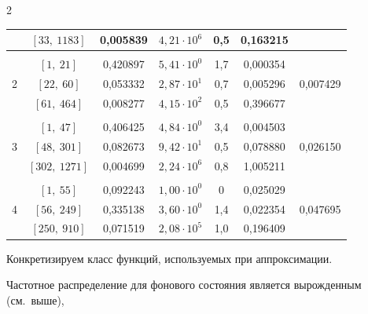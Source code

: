\begin{multicols}{2}
\begin{table}
\begin{center}
\begin{tabular}{|c|c|c|c|c|c|c|}
           & $[33,~1183]$ & 0,005839 & $4{,}21\cdot10^6$ & 0,5 & 0,163215 &\\

\hline

&&&&&&\\[-9pt]

 & $[1,~21]$ & 0,420897 & $5{,}41\cdot10^0$ & 1,7 & 0,000354 & \\

2           &$[22,~60]$ & 0,053332 & $2{,}87\cdot10^1$ & 0,7 & 0,005296 &{0,007429}\\

           & $[61,~464]$ & 0,008277 & $4{,}15\cdot10^2$ & 0,5 & 0,396677 &\\

\hline

&&&&&&\\[-9pt]

 & $[1,~47]$ & 0,406425 & $4{,}84\cdot10^0$ & 3,4 & 0,004503 & \\

3           & $[48,~301]$ & 0,082673 & $9{,}42\cdot10^1$ & 0,5 & 0,078880 &{0,026150}\\

           & $[302,~1271]$ & 0,004699 & $2{,}24\cdot10^6$ & 0,8 & 1,005211 &\\

\hline

&&&&&&\\[-9pt]

 & $[1,~55]$ & 0,092243 & $1{,}00\cdot10^0$ & 0\hphantom{,0}   & 0,025029 & \\

4           & $[56,~249]$ & 0,335138 & $3{,}60\cdot10^0$ & 1,4 & 0,022354 & {0,047695}\\

           & $[250,~910]$ & 0,071519 & $2{,}08\cdot10^5$ & 1,0 & 0,196409 &\\

\hline

\end{tabular}

\end{center}

\end{table}





Конкретизируем класс функций, используемых при аппроксимации. 

Частотное распределение для фонового состояния является вырожденным (см.~выше), 


\end{multicols}
